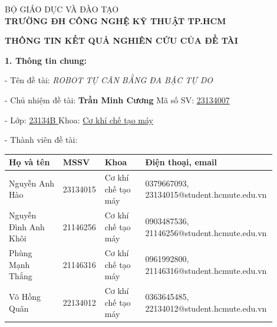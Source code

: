 
{}

{\fontsize{13pt}{15pt}\selectfont

\vspace{0.2cm}
\noindent BỘ GIÁO DỤC VÀ ĐÀO TẠO\\[0.05cm]
\noindent\textbf{TRƯỜNG ĐH CÔNG NGHỆ KỸ THUẬT TP.HCM}

\vspace{0.3cm}
\begin{center}
    {\bfseries THÔNG TIN KẾT QUẢ NGHIÊN CỨU CỦA ĐỀ TÀI}
\end{center}

\vspace{0.1cm}
\noindent\textbf{1. Thông tin chung:}

\vspace{0.1cm}
\noindent- Tên đề tài: \textit{ROBOT TỰ CÂN BẰNG ĐA BẬC TỰ DO}

\vspace{0.15cm}
\noindent- Chủ nhiệm đề tài: \textbf{Trần Minh Cương} \hfill Mã số SV: \underline{23134007}

\vspace{0.1cm}
\noindent- Lớp: \underline{\quad 23134B \quad} \hfill Khoa: \underline{\quad Cơ khí chế tạo máy \quad}

\vspace{0.2cm}
\noindent- Thành viên đề tài:

\vspace{0.1cm}
\noindent\begin{tabular}{|p{0.20\linewidth}|p{0.15\linewidth}|p{0.15\linewidth}|p{0.40\linewidth}|}
\hline
\textbf{Họ và tên} & \textbf{MSSV} & \textbf{Khoa} & \textbf{Điện thoại, email} \\
\hline
Nguyễn Anh Hào       & 23134015 & Cơ khí chế tạo máy & 0379667093, 23134015@student.hcmute.edu.vn \\
\hline
Nguyễn Đình Anh Khôi & 21146256 & Cơ khí chế tạo máy & 0903487536, 21146256@student.hcmute.edu.vn \\
\hline
Phùng Mạnh Thắng     & 21146316 & Cơ khí chế tạo máy & 0961992800, 21146316@student.hcmute.edu.vn \\
\hline
Võ Hồng Quân         & 22134012 & Cơ khí chế tạo máy & 0363645485, 22134012@student.hcmute.edu.vn \\
\hline
\end{tabular}

}
